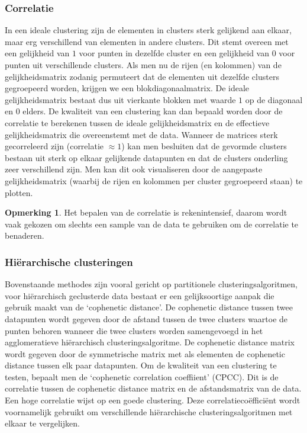 \documentclass[a4paper,12pt]{article}
\theoremstyle{definition}
\newtheorem{opm}{Opmerking}[subsection]
\begin{document}
\subsubsection*{Correlatie}
In een ideale clustering zijn de elementen in clusters sterk gelijkend aan elkaar,
maar erg verschillend van elementen in andere clusters. Dit stemt overeen met een
gelijkheid van $1$ voor punten in dezelfde cluster en een gelijkheid van $0$ voor
punten uit verschillende clusters. Als men nu de rijen (en kolommen) van de
gelijkheidsmatrix zodanig permuteert dat de elementen uit dezelfde clusters
gegroepeerd worden, krijgen we een blokdiagonaalmatrix.
De ideale gelijk\-heidsmatrix bestaat dus uit vierkante blokken met waarde $1$ op de diagonaal en $0$ elders.
De kwaliteit van een clustering kan dan bepaald worden door de correlatie te berekenen tussen de ideale gelijkheidsmatrix en de effectieve gelijkheidsmatrix die overeenstemt met de data.
Wanneer de matrices sterk gecorreleerd zijn (correlatie $\approx 1$) kan men besluiten dat de gevormde clusters bestaan uit sterk op elkaar gelijkende datapunten
en dat de clusters onderling zeer verschillend zijn.
Men kan dit ook visualiseren door de aangepaste gelijkheidsmatrix (waarbij de rijen en kolommen per cluster gegroepeerd staan) te plotten.

\begin{opm}
 Het bepalen van de correlatie is rekenintensief, daarom wordt vaak gekozen om slechts
 een sample van de data te gebruiken om de correlatie te benaderen.
\end{opm}



\subsubsection*{Hiërarchische clusteringen}
Bovenstaande methodes zijn vooral gericht op partitionele clusteringsalgoritmen, voor hiërarchisch geclusterde data bestaat er een gelijksoortige aanpak die gebruik maakt van de
`cophenetic distance'. De cophenetic distance tussen twee datapunten wordt gegeven door de afstand tussen de twee clusters waartoe de punten behoren wanneer die twee clusters
worden samengevoegd in het agglomeratieve hiërarchisch clusteringsalgoritme. De cophenetic distance matrix wordt gegeven door de symmetrische matrix met als elementen
de cophenetic distance tussen elk paar datapunten.
Om de kwaliteit van een clustering te testen, bepaalt men de `cophenetic correlation coeffiient' (CPCC). Dit is de correlatie tussen de cophenetic distance matrix en de afstandsmatrix
van de data. Een hoge correlatie wijst op een goede clustering. Deze correlatie\-coëfficiënt wordt voornamelijk gebruikt om verschillende hiërarchische clusteringsalgoritmen met elkaar te vergelijken.
\end{document}
